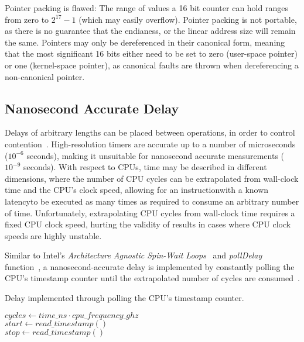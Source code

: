 Pointer packing is flawed: 
The range of values a 16 bit counter can hold ranges from zero to $2^{17}-1$
(which may easily overflow).
Pointer packing is not portable, as there is no guarantee that the endianess,
or the linear address size will remain the same. 
Pointers may only be dereferenced in their canonical form, meaning that the
most significant 16 bits either need to be set to zero (user-space pointer) or
one (kernel-space pointer), as canonical faults are thrown when
dereferencing a non-canonical pointer.

\subsection{Nanosecond Accurate Delay}
Delays of arbitrary lengths can be placed between operations, in order to
control contention~\citep{valois1994queues}. High-resolution timers are
accurate up to a number of microseconds ($10^{-6}$ seconds), making it
unsuitable for nanosecond accurate measurements ($10^{-9}$ seconds). 
With respect to CPUs, time may be described in different dimensions, where the
number of CPU cycles can be extrapolated from wall-clock time and the CPU's
clock speed, allowing for an instruction\textemdash with a known
latency\textemdash to be executed as many times as required to consume an
arbitrary number of time. Unfortunately, extrapolating CPU cycles from
wall-clock time requires a fixed CPU clock speed, hurting the validity of
results in cases where CPU clock speeds are highly unstable.


Similar to Intel's
\emph{Architecture Agnostic Spin-Wait Loops}~\citep{intel2018spinloop} and
\emph{pollDelay} function~\citep[Example~2.3]{intelmanualoptimization}, a
nanosecond-accurate delay is implemented by constantly polling the CPU's timestamp
counter until the extrapolated number of cycles are
consumed~\cite{ramalhete2019delay}.

\begin{algorithm}
    \caption{Delay implemented through polling the CPU's timestamp counter.}\label{alg:delay}
            $cycles \gets time\_ns \cdot cpu\_frequency\_ghz$ \\
            $start \gets read\_timestamp()$ \\
            {
                $stop \gets read\_timestamp()$
            }
\end{algorithm}

